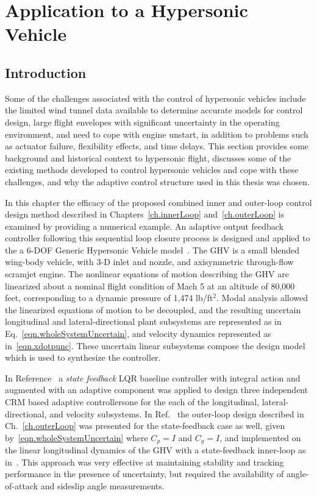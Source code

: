 \chapter{Application to a Hypersonic Vehicle}\label{ch.applicationHypersonic}

\section{Introduction}

Some of the challenges associated with the control of hypersonic vehicles include the limited wind tunnel data available to determine accurate models for control design, large flight envelopes with significant uncertainty in the operating environment, and need to cope with engine unstart, in addition to problems such as actuator failure, flexibility effects, and time delays.
This section provides some background and historical context to hypersonic flight, discusses some of the existing methods developed to control hypersonic vehicles and cope with these challenges, and why the adaptive control structure used in this thesis was chosen.

In this chapter the efficacy of the proposed combined inner and outer-loop control design method described in Chapters~\ref{ch.innerLoop} and~\ref{ch.outerLoop} is examined by providing a numerical example.
An adaptive output feedback controller following this sequential loop closure process is designed and applied to the a 6-DOF Generic Hypersonic Vehicle model\ \cite{wiese.adaptive.2013, rollins.nonlinear.2013, wiese.gnc.2015, wiese.jgcd.2015}.
The GHV is a small blended wing-body vehicle, with 3-D inlet and nozzle, and axisymmetric through-flow scramjet engine.
The nonlinear equations of motion describing the GHV are linearized about a nominal flight condition of Mach 5 at an altitude of 80,000 feet, corresponding to a dynamic pressure of 1,474 lb/ft$^2$.
Modal analysis allowed the linearized equations of motion to be decoupled, and the resulting uncertain longitudinal and lateral-directional plant subsystems are represented as in Eq.\ \eqref{eqn.wholeSystemUncertain}, and velocity dynamics represented as in\ \eqref{eqn.xdotpunc}.
These uncertain linear subsystems compose the design model which is used to synthesize the controller.

In Reference\ \cite{wiese.adaptive.2013} a \textit{state feedback} LQR baseline controller with integral action and augmented with an adaptive component was applied to design three independent CRM based adaptive controllers\textemdash{}one for the each of the longitudinal, lateral-directional, and velocity subsystems.
In Ref.\ \cite{wiese.sequential.2016} the outer-loop design described in Ch.~\ref{ch.outerLoop} was presented for the state-feedback case as well, given by\ \eqref{eqn.wholeSystemUncertain} where $C_{p}=I$ and $C_{g}=I$, and implemented on the linear longitudinal dynamics of the GHV with a state-feedback inner-loop as in\ \cite{wiese.adaptive.2013}.
This approach was very effective at maintaining stability and tracking performance in the presence of uncertainty, but required the availability of angle-of-attack and sideslip angle measurements.

